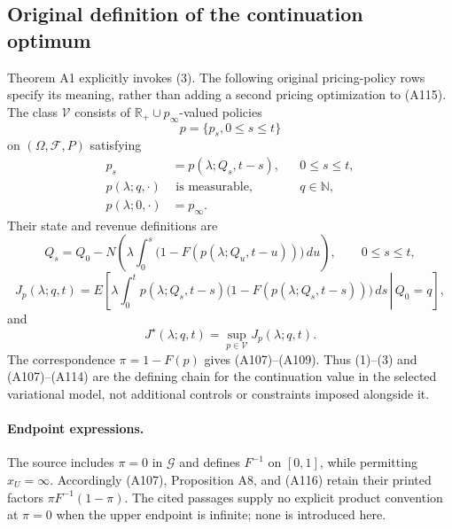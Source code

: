 \documentclass{article}
\begin{document}
\subsection*{Original definition of the continuation optimum}
Theorem A1 explicitly invokes (3). The following original pricing-policy rows specify its meaning, rather than adding a second pricing optimization to (A115). The class $\mathcal V$ consists of $\mathbb R_+\cup p_\infty$-valued policies
\[
p=\{p_s,0\leq s\leq t\}
\]
on $(\Omega,\mathcal F,P)$ satisfying
\[
\begin{aligned}
p_s&=p(\lambda;Q_s,t-s),&&0\leq s\leq t,\\
p(\lambda;q,\cdot)&\text{ is measurable},&&q\in\mathbb N,\\
p(\lambda;0,\cdot)&=p_\infty.
\end{aligned}
\]
Their state and revenue definitions are
\begin{equation}
Q_s=Q_0-N\left(\lambda\int_0^s
\bigl(1-F(p(\lambda;Q_u,t-u))\bigr)\,du\right),
\qquad 0\leq s\leq t,
\tag{2}
\end{equation}
\begin{equation}
J_p(\lambda;q,t)
=E\left[\left.\lambda\int_0^t
p(\lambda;Q_s,t-s)
\bigl(1-F(p(\lambda;Q_s,t-s))\bigr)\,ds
\,\right|\,Q_0=q\right],
\tag{1}
\end{equation}
and
\begin{equation}
J^\star(\lambda;q,t)=\sup_{p\in\mathcal V}J_p(\lambda;q,t).
\tag{3}
\end{equation}
The correspondence $\pi=1-F(p)$ gives (A107)--(A109). Thus (1)--(3) and (A107)--(A114) are the defining chain for the continuation value in the selected variational model, not additional controls or constraints imposed alongside it.

\paragraph{Endpoint expressions.}
The source includes $\pi=0$ in $\mathcal G$ and defines $F^{-1}$ on $[0,1]$, while permitting $x_U=\infty$. Accordingly (A107), Proposition A8, and (A116) retain their printed factors $\pi F^{-1}(1-\pi)$. The cited passages supply no explicit product convention at $\pi=0$ when the upper endpoint is infinite; none is introduced here.
\end{document}

